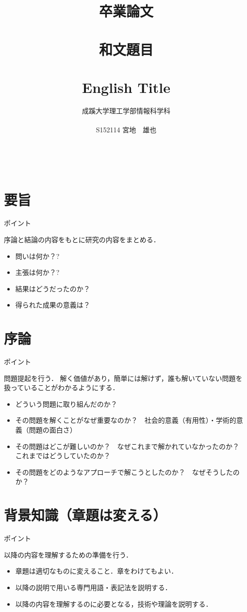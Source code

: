 \documentclass[a4j,11pt,report]{jsbook}
\title{卒業論文\\　\vspace{3em}\\{\huge #1}\\　\\#2\vspace{15em}}%
\author{{\huge 成蹊大学理工学部情報科学科}\\　\\{\huge #3}}%
\date{}
\newcommand{\frontpage}[3]{%
\title{卒業論文\\　\vspace{3em}\\{\huge #1}\\　\\#2\vspace{15em}}%
\author{{\huge 成蹊大学理工学部情報科学科}\\　\\{\huge #3}}%
\date{}
\maketitle
\clearpage
\thispagestyle{empty}
　
\clearpage
}
\newcommand{\point}[1]{
\begin{itembox}[l]{ポイント}
#1
\end{itembox}
}
\begin{document}
\frontpage  %
{和文題目}
{English Title}
{S152114 宮地　雄也}

\chapter*{要旨}
\thispagestyle{empty}
\point{
序論と結論の内容をもとに研究の内容をまとめる．
\begin{itemize}
\item 問いは何か？?
\item 主張は何か？?
\item 結果はどうだったのか？
\item 得られた成果の意義は？
\end{itemize}
}

\tableofcontents
\thispagestyle{empty}
\clearpage
\thispagestyle{plain}
\setcounter{page}{1}

\chapter{序論 \label{ch:introduction}}

\point{
問題提起を行う．
解く価値があり，簡単には解けず，誰も解いていない問題を扱っていることがわかるようにする．
\begin{itemize}
\item どういう問題に取り組んだのか？
\item その問題を解くことがなぜ重要なのか？　社会的意義（有用性）・学術的意義（問題の面白さ）
\item その問題はどこが難しいのか？　なぜこれまで解かれていなかったのか？　これまではどうしていたのか？
\item その問題をどのようなアプローチで解こうとしたのか？　なぜそうしたのか？
\end{itemize}
}

\chapter{背景知識（章題は変える）\label{ch:background}}

\point{
以降の内容を理解するための準備を行う．
\begin{itemize}
\item 章題は適切なものに変えること．章をわけてもよい．
\item 以降の説明で用いる専門用語・表記法を説明する．
\item 以降の内容を理解するのに必要となる，技術や理論を説明する．
\end{itemize}
}
\end{document}

